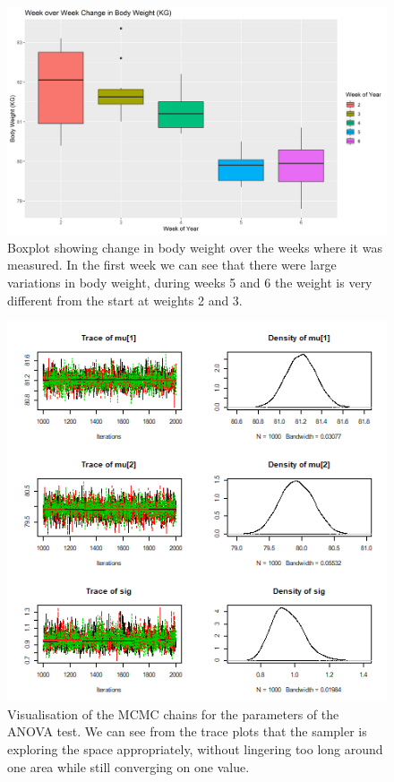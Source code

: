 \documentclass[journal, a4paper]{IEEEtran}
\begin{document}
\begin{figure}[h!]
	\includegraphics[width=\linewidth]{../plots/03_bw_vs_wk.png}
	\caption{Boxplot showing change in body weight over the weeks where it was measured. In the first week we can see that there were large variations in body
	weight, during weeks 5 and 6 the weight is very different from the start at weights 2 and 3.}
	\label{fig:3}
\end{figure}

\begin{figure}[h!]
	\includegraphics{../plots/04_chains_ANOVA.png}
	\caption{Visualisation of the MCMC chains for the parameters of the ANOVA test. We can see from the trace plots that the sampler is exploring the space
	appropriately, without lingering too long around one area while still converging on one value.}
	\label{fig:4}
\end{figure}
\end{document}
